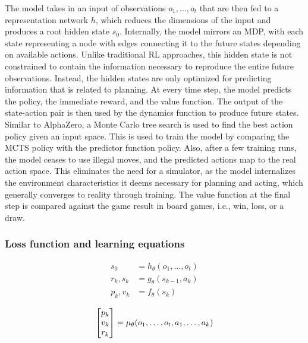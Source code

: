 The model takes in an input of observations $o_1, \ldots, o_t$ that are then fed to a representation network $h$,
which reduces the dimensions of the input and produces a root hidden state $s_0$. Internally, the model
mirrors an MDP, with each state representing a node with edges connecting it to the future states
depending on available actions. Unlike traditional RL approaches, this hidden state is not constrained to
contain the information necessary to reproduce the entire future observations. Instead, the hidden states
are only optimized for predicting information that is related to planning. At every time step, the model
predicts the policy, the immediate reward, and the value function. The output of the state-action pair is
then used by the dynamics function to produce future states. Similar to AlphaZero, a Monte Carlo tree
search is used to find the best action policy given an input space. This is used to train the model by
comparing the MCTS policy with the predictor function policy. Also, after a few training runs, the model
ceases to use illegal moves, and the predicted actions map to the real action space. This eliminates the
need for a simulator, as the model internalizes the environment characteristics it deems necessary for
planning and acting, which generally converges to reality through training. The value function at
the final step is compared against the game result in board games, i.e., win, loss, or a draw.

\subsubsection{Loss function and learning equations}

\begin{align}
    s_0      & = h_\theta(o_1, \ldots, o_t) \\
    r_k, s_k & = g_\theta(s_{k-1}, a_k)     \\
    p_k, v_k & = f_\theta(s_k)
\end{align}

\begin{equation}
    \setlength{\arraycolsep}{1.5pt} %
    \begin{bmatrix}
        p_k \\ v_k \\ r_k
    \end{bmatrix}
    =
    \mu_\theta(o_1, \ldots, o_t, a_1, \ldots, a_k)
    \label{eq:matrix}
\end{equation}

